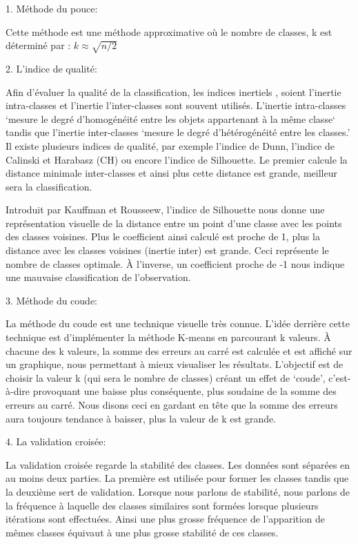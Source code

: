 \documentclass[12pt,a4paper]{book}
\newcommand{\1}{\mathds{1}}
\begin{document}
\begin{description}
  \item 1. Méthode du pouce:
  
  Cette méthode est une méthode approximative où le nombre de classes, k est déterminé par : 
$ k \approx \sqrt{n/2}$

    \item 2. L'indice de qualité:
    
	Afin d’évaluer la qualité de la classification, les indices inertiels , soient l’inertie intra-classes et l’inertie l’inter-classes sont souvent utilisés. L’inertie intra-classes ‘mesure le degré d’homogénéité entre les objets appartenant à la même classe‘ tandis que l’inertie inter-classes ‘mesure le degré d’hétérogénéité entre les classes.’
Il existe plusieurs indices de qualité, par exemple l’indice de Dunn, l’indice de Calinski et Harabasz (CH) ou encore l’indice de Silhouette. 
Le premier calcule la distance minimale inter-classes et ainsi plus cette distance est grande, meilleur sera la classification. 

Introduit par Kauffman et Rousseew, l’indice de Silhouette nous donne une représentation visuelle de la distance entre un point d’une classe avec les points des classes voisines. Plus le coefficient ainsi calculé est proche de 1, plus la distance avec les classes voisines (inertie inter) est grande. Ceci représente le nombre de classes optimale. À l’inverse, un coefficient proche de -1 nous indique une mauvaise classification de l’observation.


		\item 3. Méthode du coude:
		
  La méthode du coude est une technique visuelle très connue. L’idée derrière cette technique est d’implémenter la méthode K-means en parcourant k valeurs. À chacune des k valeurs, la somme des erreurs au carré est calculée et est affiché sur un graphique, nous permettant à mieux visualiser les résultats. L’objectif est de choisir la valeur k (qui sera le nombre de classes) créant un effet de ‘coude’, c’est-à-dire provoquant une baisse plus conséquente, plus soudaine de la somme des erreurs au carré. Nous disons ceci en gardant en tête que la somme des erreurs aura toujours tendance à baisser, plus la valeur de k est grande. 
  
 	 \item 4. La validation croisée:
 	 
La validation croisée regarde la stabilité des classes. Les données sont séparées en au moins deux parties. La première est utilisée pour former les classes tandis que la deuxième sert de validation. Lorsque nous parlons de stabilité, nous parlons de la fréquence à laquelle des classes similaires sont formées lorsque plusieurs itérations sont effectuées. Ainsi une plus grosse fréquence de l’apparition de mêmes classes équivaut à une plus grosse stabilité de ces classes.
 	 
\end{description}
\end{document}
